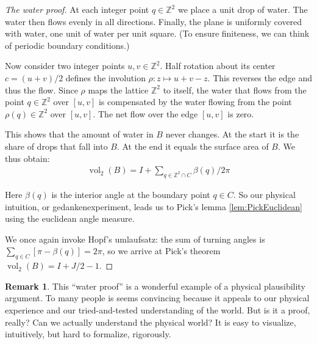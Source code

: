 \documentclass[a4paper]{amsart}
\numberwithin{equation}{section}
\theoremstyle{plain}
\theoremstyle{definition}
\newtheorem{remark}[theorem]{Remark}
\newcommand{\Z}{\mathbb{Z}}
\DeclareMathOperator{\vol}{vol}
\begin{document}
\begin{proof}[The water proof]
  At each integer point $q \in \Z^2$ we place a unit drop of water.
  The water then flows evenly in all directions.  Finally, the plane is
  uniformly covered with water, one unit of water per unit square.
  (To ensure finiteness, we can think of periodic boundary conditions.)

  Now consider two integer points $u,v \in \Z^2$.
  Half rotation about its center $c = (u+v)/2$
  defines the involution $\rho \colon z \mapsto u + v - z$.
  This reverses the edge and thus the flow.
  Since $\rho$ maps the lattice $\Z^2$ to itself,
  the water that flows from the point $q \in \Z^2$ over $[u,v]$ 
  is compensated by the water flowing from the point $\rho(q) \in \Z^2$ over $[u,v]$.
  The net flow over the edge $[u,v]$ is zero.
  
  This shows that the amount of water in $B$ never changes.
  At the start it is the share of drops that fall into $B$.
  At the end it equals the surface area of $B$.
  We thus obtain:
  \begin{align}
    \vol_2(B) = I + \sum_{q \in \Z^2 \cap C} \beta(q) / 2\pi
  \end{align}

  Here $\beta(q)$ is the interior angle at the boundary point $q \in C$.
  So our physical intuition, or gedankenexperiment, leads us to
  Pick's lemma \ref{lem:PickEuclidean} using the euclidean angle measure.

  We once again invoke Hopf's umlaufsatz:
  the sum of turning angles is $\sum_{q \in C} [ \pi - \beta(q) ] = 2\pi$,
  so we arrive at Pick's theorem $\vol_2(B) = I + J/2 - 1$.
\end{proof}



\begin{remark}
  This “water proof” is a wonderful example
  of a physical plausibility argument.
  To many people is seems convincing
  because it appeals to our physical experience
  and our tried-and-tested understanding of the world.
  But is it a proof, really?
  Can we actually understand the physical world?
  It is easy to visualize, intuitively, but hard to formalize, rigorously.
\end{remark}
\end{document}
